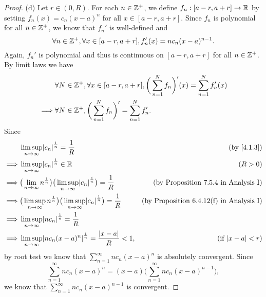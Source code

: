 \begin{proof}{(d)}
  Let \(r \in (0, R)\).
  For each \(n \in \mathbb{Z}^+\), we define \(f_n : [a - r, a + r] \to \mathbb{R}\) by setting \(f_n(x) = c_n (x - a)^n\) for all \(x \in [a - r, a + r]\).
  Since \(f_n\) is polynomial for all \(n \in \mathbb{Z}^+\), we know that \(f_n'\) is well-defined and
  \[
    \forall n \in \mathbb{Z}^+, \forall x \in [a - r, a + r], f_n'(x) = n c_n (x - a)^{n - 1}.
  \]
  Again, \(f_n'\) is polynomial and thus is continuous on \([a - r, a + r]\) for all \(n \in \mathbb{Z}^+\).
  By limit laws we have
  \begin{align*}
             & \forall N \in \mathbb{Z}^+, \forall x \in [a - r, a + r], \bigg(\sum_{n = 1}^N f_n\bigg)'(x) = \sum_{n = 1}^N f_n'(x) \\
    \implies & \forall N \in \mathbb{Z}^+, \bigg(\sum_{n = 1}^N f_n\bigg)' = \sum_{n = 1}^N f_n'.
  \end{align*}
  Since
  \begin{align*}
             & \limsup_{n \to \infty} \abs{c_n}^{\frac{1}{n}} = \frac{1}{R}                                                            & \text{(by \cref{4.1.3})}                        \\
    \implies & \limsup_{n \to \infty} \abs{c_n}^{\frac{1}{n}} \in \R                                                                   & (R > 0)                                         \\
    \implies & \big(\lim_{n \to \infty} n^{\frac{1}{n}}\big) \big(\limsup_{n \to \infty} \abs{c_n}^{\frac{1}{n}}\big) = \frac{1}{R}    & \text{(by Proposition 7.5.4 in Analysis I)}     \\
    \implies & \big(\limsup_{n \to \infty} n^{\frac{1}{n}}\big) \big(\limsup_{n \to \infty} \abs{c_n}^{\frac{1}{n}}\big) = \frac{1}{R} & \text{(by Proposition 6.4.12(f) in Analysis I)} \\
    \implies & \limsup_{n \to \infty} \abs{n c_n}^{\frac{1}{n}} = \frac{1}{R}                                                                                                            \\
    \implies & \limsup_{n \to \infty} \abs{n c_n (x - a)^n}^{\frac{1}{n}} = \frac{\abs{x - a}}{R} < 1,                                 & \text{(if \(\abs{x - a} < r\))}
  \end{align*}
  by root test we know that \(\sum_{n = 1}^\infty n c_n (x - a)^n\) is absolutely convergent.
  Since
  \[
    \sum_{n = 1}^\infty n c_n (x - a)^n = (x - a) \bigg(\sum_{n = 1}^\infty n c_n (x - a)^{n - 1}\bigg),
  \]
  we know that \(\sum_{n = 1}^\infty n c_n (x - a)^{n - 1}\) is convergent.

\end{proof}
